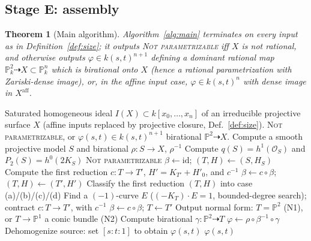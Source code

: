 \documentclass{amsart}
\theoremstyle{plain}
\newtheorem{theorem}{Theorem}
\theoremstyle{definition}
\newcommand{\PP}{\mathbb{P}}
\newcommand{\cO}{\mathcal{O}}
\begin{document}
\subsection{Stage E: assembly}

\begin{theorem}[Main algorithm]\label{thm:main}
Algorithm~\ref{alg:main} terminates on every input as in
Definition~\ref{def:size}; it outputs \textsc{Not parametrizable} iff $X$ is not
rational, and otherwise outputs $\varphi\in k(s,t)^{n+1}$ defining a dominant
rational map $\PP^2_k\dashrightarrow X\subset\PP^n_k$ which is birational onto
$X$ (hence a rational parametrization with Zariski-dense image), or, in the
affine input case, $\varphi\in k(s,t)^{n}$ with dense image in
$X^{\mathrm{aff}}$.
\end{theorem}

\begin{algorithm}
\caption{Rational parametrization of a surface}\label{alg:main}
\begin{algorithmic}[1]
\Require Saturated homogeneous ideal $I(X)\subset k[x_0,\dots,x_n]$ of an
irreducible projective surface $X$ (affine inputs replaced by projective closure,
Def.~\ref{def:size}).
\Ensure \textsc{Not parametrizable}, or $\varphi(s,t)\in k(s,t)^{n+1}$ birational
$\PP^2\dashrightarrow X$.
\State Compute a smooth projective model $S$ and birational $\rho\colon S\to X$,
$\rho^{-1}$ 
\State Compute $q(S)=h^1(\cO_S)$ and $P_2(S)=h^0(2K_S)$ 
  \State \Return \textsc{Not parametrizable} 
\EndIf
\State $\beta\gets\mathrm{id}$; $(T,H)\gets(S,H_S)$ 
  \State Compute the first reduction $c\colon T\to T'$, $H'=K_{T'}+H'_0$, and $c^{-1}$
  \State $\beta\gets c\circ\beta$; $(T,H)\gets(T',H')$
\EndWhile
\State Classify the first reduction $(T,H)$ into case (a)/(b)/(c)/(d)
 
    \State Find a $(-1)$-curve $E$ ($(-K_T)\cdot E=1$, bounded-degree search);
    contract $c\colon T\to T'$, with $c^{-1}$
    \State $\beta\gets c\circ\beta$; $T\gets T'$
  \EndWhile
\EndIf
\State Output normal form: $T=\PP^2$ \textup{(N1)}, or $T\to\PP^1$ a conic bundle \textup{(N2)}
\State Compute birational $\gamma\colon\PP^2\dashrightarrow T$
\State $\varphi\gets\rho\circ\beta^{-1}\circ\gamma$ 
\State Dehomogenize source: set $[s:t:1]$ to obtain $\varphi(s,t)$
\State \Return $\varphi(s,t)$
\end{algorithmic}
\end{algorithm}
\end{document}
